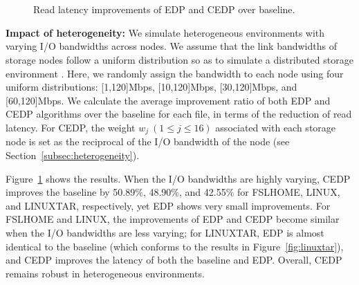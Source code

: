 \begin{figure}[h]
\centering
{}
\\
\\
\vspace{-6pt}
\caption{Read latency improvements of EDP and CEDP over baseline.}
\label{fig:sim_hete}
\end{figure}

\textbf{Impact of heterogeneity:} We simulate heterogeneous environments with
varying I/O bandwidths across nodes. We assume that the link bandwidths of
storage nodes follow a uniform distribution so as to simulate a distributed
storage environment \cite{li10}. 
Here,  we randomly assign the bandwidth to each node using four
uniform distributions: [1,120]Mbps, [10,120]Mbps, [30,120]Mbps, and
[60,120]Mbps.  We calculate the average improvement ratio of both EDP and CEDP
algorithms over the baseline for each file, in terms of the reduction of read
latency.  For CEDP, the weight $w_j~(1\le j \le 16)$ associated with each
storage node is set as the reciprocal of the I/O bandwidth of the node
(see Section~\ref{subsec:heterogeneity}).


Figure~\ref{fig:sim_hete} shows the results.  When the I/O bandwidths are
highly varying, CEDP improves the baseline by 50.89\%, 48.90\%, and 42.55\% 
for FSLHOME, LINUX, and LINUXTAR, respectively, yet EDP shows very
small improvements.  For FSLHOME and LINUX, the improvements of EDP and CEDP 
become similar when the I/O bandwidths are less varying; for LINUXTAR, EDP is
almost identical to the baseline (which conforms to the results in
Figure~\ref{fig:linuxtar}), and CEDP improves the latency of both the baseline
and EDP.  Overall, CEDP remains robust in heterogeneous environments. 


